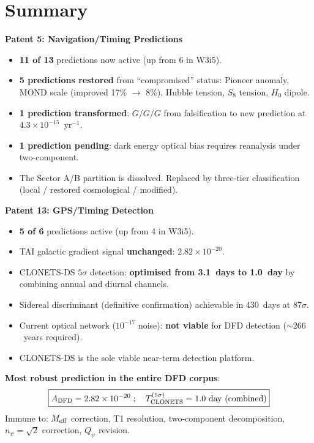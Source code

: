 \documentclass[11pt]{article}
\newcommand{\ee}[1]{\times 10^{#1}}
\newcommand{\Meff}{M_{\rm eff}}
\newcommand{\Hzero}{H_0}
\newcommand{\Gdot}{\dot{G}/G}
\begin{document}
\section{Summary}
\label{sec:summary}

\begin{tcolorbox}[colback=blue!5!white, colframe=blue!60!black,
  title=\textbf{W3i6 P5+P13 Summary}]

\textbf{Patent 5: Navigation/Timing Predictions}
\begin{itemize}[nosep]
\item \textbf{11 of 13} predictions now active (up from 6 in W3i5).
\item \textbf{5 predictions restored} from ``compromised'' status:
  Pioneer anomaly, MOND scale (improved 17\% $\to$ 8\%), Hubble tension,
  $S_8$ tension, $\Hzero$ dipole.
\item \textbf{1 prediction transformed}: $\Gdot/G$ from falsification to
  new prediction at $4.3\ee{-15}$~yr$^{-1}$.
\item \textbf{1 prediction pending}: dark energy optical bias requires
  reanalysis under two-component.
\item The Sector A/B partition is dissolved. Replaced by three-tier
  classification (local / restored cosmological / modified).
\end{itemize}

\textbf{Patent 13: GPS/Timing Detection}
\begin{itemize}[nosep]
\item \textbf{5 of 6} predictions active (up from 4 in W3i5).
\item TAI galactic gradient signal \textbf{unchanged}: $2.82\ee{-20}$.
\item CLONETS-DS $5\sigma$ detection: \textbf{optimised from 3.1~days to
  1.0~day} by combining annual and diurnal channels.
\item Sidereal discriminant (definitive confirmation) achievable in
  430~days at $87\sigma$.
\item Current optical network ($10^{-17}$ noise): \textbf{not viable}
  for DFD detection ($\sim 266$~years required).
\item CLONETS-DS is the sole viable near-term detection platform.
\end{itemize}

\textbf{Most robust prediction in the entire DFD corpus}:
\begin{equation}
\boxed{A_{\rm DFD} = 2.82\ee{-20}\;;\quad
T^{(5\sigma)}_{\rm CLONETS} = 1.0~\text{day (combined)}}
\end{equation}
Immune to: $\Meff$ correction, T1 resolution, two-component
decomposition, $n_\psi = \sqrt{2}$ correction, $Q_\psi$ revision.
\end{tcolorbox}
\end{document}
